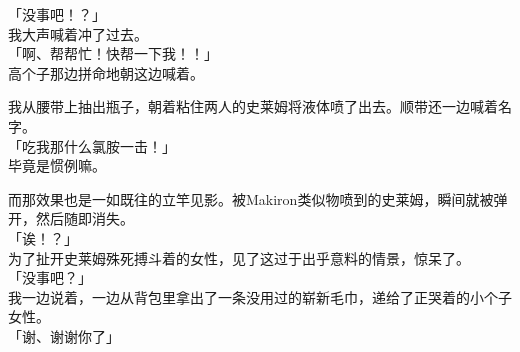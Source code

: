 「没事吧！？」\\

我大声喊着冲了过去。\\

「啊、帮帮忙！快帮一下我！！」\\

高个子那边拼命地朝这边喊着。

我从腰带上抽出瓶子，朝着粘住两人的史莱姆将液体喷了出去。顺带还一边喊着名字。\\

「吃我那什么氯胺一击！」\\

毕竟是惯例嘛。

而那效果也是一如既往的立竿见影。被Makiron类似物喷到的史莱姆，瞬间就被弹开，然后随即消失。\\

「诶！？」\\

为了扯开史莱姆殊死搏斗着的女性，见了这过于出乎意料的情景，惊呆了。\\

「没事吧？」\\

我一边说着，一边从背包里拿出了一条没用过的崭新毛巾，递给了正哭着的小个子女性。\\

「谢、谢谢你了」\\

